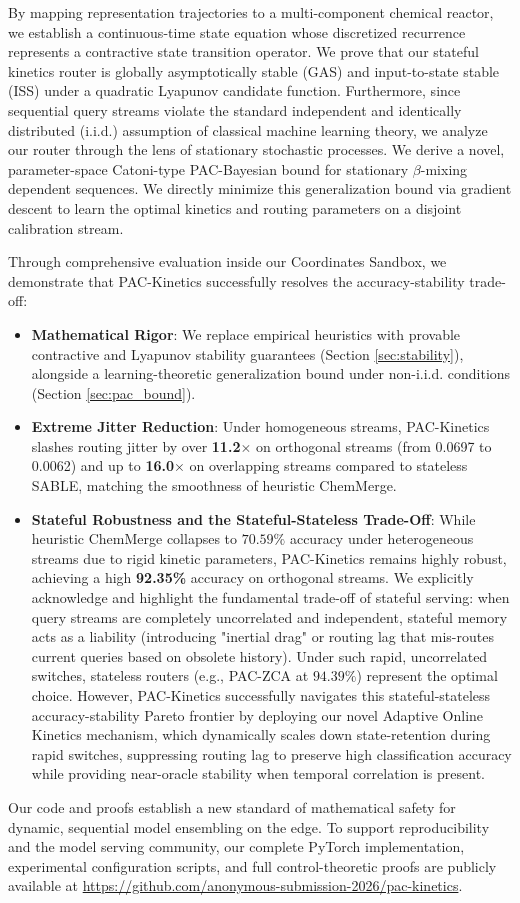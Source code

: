 By mapping representation trajectories to a multi-component chemical reactor, we establish a continuous-time state equation whose discretized recurrence represents a contractive state transition operator. We prove that our stateful kinetics router is globally asymptotically stable (GAS) and input-to-state stable (ISS) under a quadratic Lyapunov candidate function. Furthermore, since sequential query streams violate the standard independent and identically distributed (i.i.d.) assumption of classical machine learning theory, we analyze our router through the lens of stationary stochastic processes. We derive a novel, parameter-space Catoni-type PAC-Bayesian bound for stationary $\beta$-mixing dependent sequences. We directly minimize this generalization bound via gradient descent to learn the optimal kinetics and routing parameters on a disjoint calibration stream.

Through comprehensive evaluation inside our Coordinates Sandbox, we demonstrate that PAC-Kinetics successfully resolves the accuracy-stability trade-off:
\begin{itemize}
    \item \textbf{Mathematical Rigor}: We replace empirical heuristics with provable contractive and Lyapunov stability guarantees (Section \ref{sec:stability}), alongside a learning-theoretic generalization bound under non-i.i.d. conditions (Section \ref{sec:pac_bound}).
    \item \textbf{Extreme Jitter Reduction}: Under homogeneous streams, PAC-Kinetics slashes routing jitter by over \textbf{11.2$\times$} on orthogonal streams (from 0.0697 to 0.0062) and up to \textbf{16.0$\times$} on overlapping streams compared to stateless SABLE, matching the smoothness of heuristic ChemMerge.
    \item \textbf{Stateful Robustness and the Stateful-Stateless Trade-Off}: While heuristic ChemMerge collapses to $70.59\%$ accuracy under heterogeneous streams due to rigid kinetic parameters, PAC-Kinetics remains highly robust, achieving a high \textbf{92.35\%} accuracy on orthogonal streams. We explicitly acknowledge and highlight the fundamental trade-off of stateful serving: when query streams are completely uncorrelated and independent, stateful memory acts as a liability (introducing "inertial drag" or routing lag that mis-routes current queries based on obsolete history). Under such rapid, uncorrelated switches, stateless routers (e.g., PAC-ZCA at $94.39\%$) represent the optimal choice. However, PAC-Kinetics successfully navigates this stateful-stateless accuracy-stability Pareto frontier by deploying our novel Adaptive Online Kinetics mechanism, which dynamically scales down state-retention during rapid switches, suppressing routing lag to preserve high classification accuracy while providing near-oracle stability when temporal correlation is present.
\end{itemize}
Our code and proofs establish a new standard of mathematical safety for dynamic, sequential model ensembling on the edge. To support reproducibility and the model serving community, our complete PyTorch implementation, experimental configuration scripts, and full control-theoretic proofs are publicly available at \url{https://github.com/anonymous-submission-2026/pac-kinetics}.

